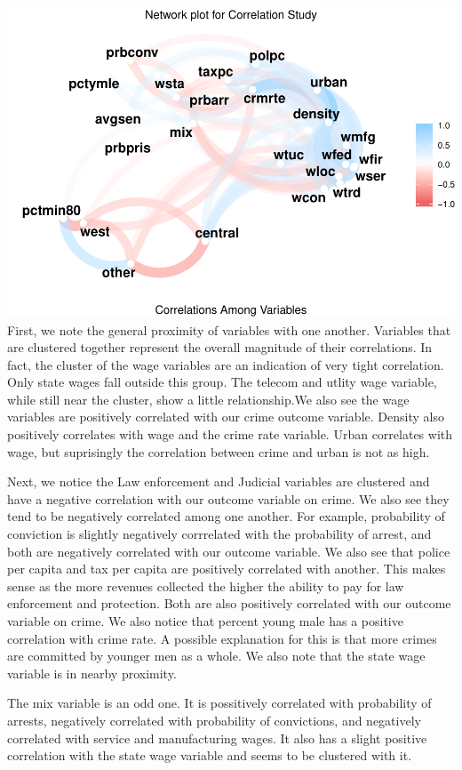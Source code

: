 \documentclass[]{article}
\begin{document}
\includegraphics{Bagnard_Gaustad_Hartman_Leung_Lab_3_files/figure-latex/unnamed-chunk-43-1.pdf}
First, we note the general proximity of variables with one another.
Variables that are clustered together represent the overall magnitude of
their correlations. In fact, the cluster of the wage variables are an
indication of very tight correlation. Only state wages fall outside this
group. The telecom and utlity wage variable, while still near the
cluster, show a little relationship.We also see the wage variables are
positively correlated with our crime outcome variable. Density also
positively correlates with wage and the crime rate variable. Urban
correlates with wage, but suprisingly the correlation between crime and
urban is not as high.

Next, we notice the Law enforcement and Judicial variables are clustered
and have a negative correlation with our outcome variable on crime. We
also see they tend to be negatively correlated among one another. For
example, probability of conviction is slightly negatively corrrelated
with the probability of arrest, and both are negatively correlated with
our outcome variable. We also see that police per capita and tax per
capita are positively correlated with another. This makes sense as the
more revenues collected the higher the ability to pay for law
enforcement and protection. Both are also positively correlated with our
outcome variable on crime. We also notice that percent young male has a
positive correlation with crime rate. A possible explanation for this is
that more crimes are committed by younger men as a whole. We also note
that the state wage variable is in nearby proximity.

The mix variable is an odd one. It is possitively correlated with
probability of arrests, negatively correlated with probability of
convictions, and negatively correlated with service and manufacturing
wages. It also has a slight positive correlation with the state wage
variable and seems to be clustered with it.
\end{document}
